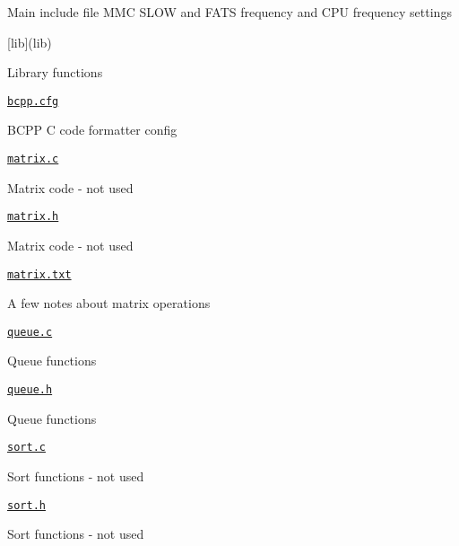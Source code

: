 \begin{DoxyItemize}
\begin{DoxyItemize}
\begin{DoxyItemize}
\item Main include file M\+MC S\+L\+OW and F\+A\+TS frequency and C\+PU frequency settings
\end{DoxyItemize}
\end{DoxyItemize}
\item \mbox{[}lib\mbox{]}(lib)
\begin{DoxyItemize}
\item Library functions
\item \href{lib/bcpp.cfg}{\tt bcpp.\+cfg}
\begin{DoxyItemize}
\item B\+C\+PP C code formatter config
\end{DoxyItemize}
\item \href{lib/matrix.c}{\tt matrix.\+c}
\begin{DoxyItemize}
\item Matrix code -\/ not used
\end{DoxyItemize}
\item \href{lib/matrix.h}{\tt matrix.\+h}
\begin{DoxyItemize}
\item Matrix code -\/ not used
\end{DoxyItemize}
\item \href{lib/matrix.txt}{\tt matrix.\+txt}
\begin{DoxyItemize}
\item A few notes about matrix operations
\end{DoxyItemize}
\item \href{lib/queue.c}{\tt queue.\+c}
\begin{DoxyItemize}
\item Queue functions
\end{DoxyItemize}
\item \href{lib/queue.h}{\tt queue.\+h}
\begin{DoxyItemize}
\item Queue functions
\end{DoxyItemize}
\item \href{lib/sort.c}{\tt sort.\+c}
\begin{DoxyItemize}
\item Sort functions -\/ not used
\end{DoxyItemize}
\item \href{lib/sort.h}{\tt sort.\+h}
\begin{DoxyItemize}
\item Sort functions -\/ not used
\end{DoxyItemize}

\end{DoxyItemize}
\end{DoxyItemize}
